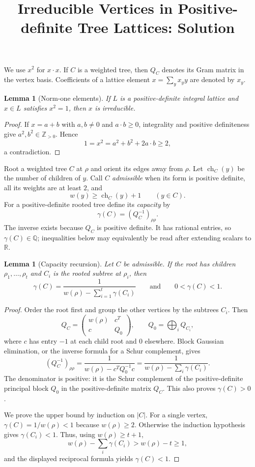 \documentclass[11pt]{article}
\newtheorem{lemma}[theorem]{Lemma}
\DeclareMathOperator{\ch}{ch}
\begin{document}
\title{Irreducible Vertices in Positive-definite Tree Lattices: Solution}
\date{}
\maketitle

We use $x^2$ for $x\mathbin{\cdot}x$.  If $C$ is a weighted tree, then
$Q_C$ denotes its Gram matrix in the vertex basis.  Coefficients of a lattice
element $x=\sum_y x_y y$ are denoted by $x_y$.

\begin{lemma}[Norm-one elements]
If $L$ is a positive-definite integral lattice and $x\in L$ satisfies
$x^2=1$, then $x$ is irreducible.
\end{lemma}

\begin{proof}
If $x=a+b$ with $a,b\neq 0$ and $a\mathbin{\cdot}b\geq0$, integrality and
positive definiteness give $a^2,b^2\in\mathbb Z_{>0}$.  Hence
\[
 1=x^2=a^2+b^2+2a\mathbin{\cdot}b\geq2,
\]
a contradiction.
\end{proof}

Root a weighted tree $C$ at $\rho$ and orient its edges away from $\rho$.
Let $\ch_C(y)$ be the number of children of $y$.  Call $C$ \emph{admissible}
when its form is positive definite, all its weights are at least $2$, and
\[
 w(y)\geq \ch_C(y)+1\qquad(y\in C).
\]
For a positive-definite rooted tree define its \emph{capacity} by
\[
 \gamma(C)=(Q_C^{-1})_{\rho\rho}.
\]
The inverse exists because $Q_C$ is positive definite.  It has rational
entries, so $\gamma(C)\in\mathbb Q$; inequalities below may equivalently be
read after extending scalars to $\mathbb R$.

\begin{lemma}[Capacity recursion]
Let $C$ be admissible.  If the root has children
$\rho_1,\ldots,\rho_t$ and $C_i$ is the rooted subtree at $\rho_i$, then
\[
 \gamma(C)=\frac{1}{w(\rho)-\sum_{i=1}^t\gamma(C_i)}
 \qquad\text{and}\qquad 0<\gamma(C)<1.
\]
\end{lemma}

\begin{proof}
Order the root first and group the other vertices by the subtrees $C_i$.
Then
\[
 Q_C=\begin{pmatrix}w(\rho)&c^T\\c&Q_0\end{pmatrix},
 \qquad Q_0=\bigoplus_i Q_{C_i},
\]
where $c$ has entry $-1$ at each child root and $0$ elsewhere.  Block
Gaussian elimination, or the inverse formula for a Schur complement, gives
\[
 (Q_C^{-1})_{\rho\rho}
 =\frac{1}{w(\rho)-c^TQ_0^{-1}c}
 =\frac{1}{w(\rho)-\sum_i\gamma(C_i)}.
\]
The denominator is positive: it is the Schur complement of the
positive-definite principal block $Q_0$ in the positive-definite matrix
$Q_C$.  This also proves $\gamma(C)>0$.

We prove the upper bound by induction on $|C|$.  For a single vertex,
$\gamma(C)=1/w(\rho)<1$ because $w(\rho)\geq2$.  Otherwise the induction
hypothesis gives $\gamma(C_i)<1$.  Thus, using
$w(\rho)\geq t+1$,
\[
 w(\rho)-\sum_i\gamma(C_i)>w(\rho)-t\geq1,
\]
and the displayed reciprocal formula yields $\gamma(C)<1$.
\end{proof}
\end{document}
